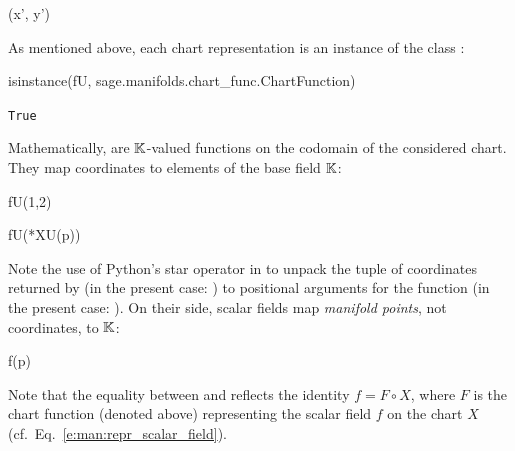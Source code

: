 \begin{NBoutM}
\left({x'}, {y'}\right) \mapsto {}
\end{NBoutM}
As mentioned above, each chart representation is an instance of the
class :
\begin{NBin}
isinstance(fU, sage.manifolds.chart_func.ChartFunction)
\end{NBin}
\begin{NBout}
\texttt{True}
\end{NBout}
Mathematically,  are $\mathbb{K}$-valued functions on the codomain of
the considered chart. They map coordinates to elements of the base field $\mathbb{K}$:
\begin{NBin}
fU(1,2)
\end{NBin}
\begin{NBoutM}
\end{NBoutM}
\begin{NBin}
fU(*XU(p))
\end{NBin}
\begin{NBoutM}
\end{NBoutM}
Note the use of Python's star operator in  to unpack the tuple of coordinates
returned by  (in the present case: ) to positional arguments
for the function  (in the present case: ).
On their side, scalar fields map \emph{manifold points}, not coordinates, to $\mathbb{K}$:
\begin{NBin}
f(p)
\end{NBin}
\begin{NBoutM}
\end{NBoutM}
Note that the equality between  and 
reflects the identity $f = F \circ X$, where $F$ is the chart function
(denoted  above)
representing the scalar field $f$ on the chart $X$
(cf.\ Eq.~\eqref{e:man:repr_scalar_field}).

